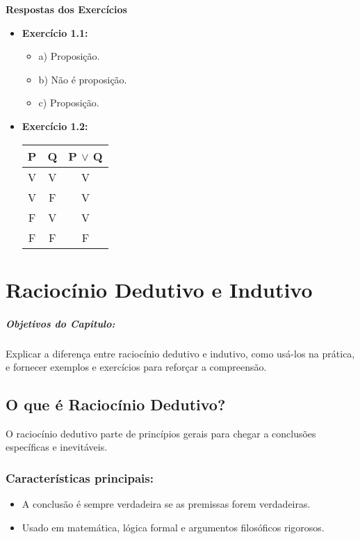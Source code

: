 \documentclass[a4paper,12pt]{book}
\begin{document}
\textbf{Respostas dos Exercícios}
\begin{itemize}
    \item \textbf{Exercício 1.1:}
    \begin{itemize}
        \item a) Proposição.
        \item b) Não é proposição.
        \item c) Proposição.
    \end{itemize}
    \item \textbf{Exercício 1.2:}
    \begin{table}[h!]
    \centering
    \begin{tabular}{|c|c|c|}
    \hline
    P & Q & P \(\lor\) Q \\
    \hline
    V & V & V \\
    V & F & V \\
    F & V & V \\
    F & F & F \\
    \hline
    \end{tabular}
    \end{table}
\end{itemize}

\chapter{Raciocínio Dedutivo e Indutivo}

\paragraph{Objetivos do Capitulo:}

Explicar a diferença entre raciocínio dedutivo e indutivo, como usá-los na prática, e fornecer exemplos e exercícios para reforçar a compreensão.

\section{O que é Raciocínio Dedutivo?}

O raciocínio dedutivo parte de princípios gerais para chegar a conclusões específicas e inevitáveis.

\subsection*{Características principais:}

\begin{itemize}
\item A conclusão é sempre verdadeira se as premissas forem verdadeiras.
\item Usado em matemática, lógica formal e argumentos filosóficos rigorosos.
\end{itemize}
\end{document}
